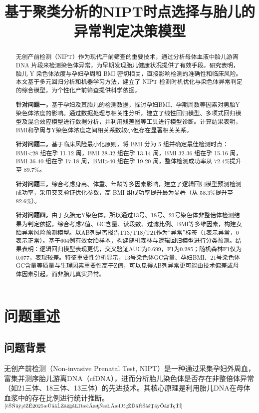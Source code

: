 \documentclass[withoutpreface,bwprint]{cumcmthesis} %
\title{基于聚类分析的NIPT时点选择与胎儿的异常判定决策模型}
\begin{document}
\maketitle
\nocite{*}


\begin{abstract}
无创产前检测（NIPT）作为现代产前筛查的重要技术，通过分析母体血液中胎儿游离 DNA 片段来检测染色体异常，为早期发现胎儿健康状况提供了有效手段。研究表明，胎儿 Y 染色体浓度与孕妇孕周和 BMI 密切相关，直接影响检测的准确性和临床风险。本文基于多元回归分析和机器学习方法，建立了 NIPT 检测时机优化与染色体异常判定的综合模型，为个性化产前筛查提供科学依据。

    \textbf{针对问题一，}基于孕妇及其胎儿的检测数据，探讨孕妇BMI、孕期周数等因素对男胎Y染色体浓度的影响。通过数据处理与相关性分析，建立了线性回归模型、多项式回归模型及混合效应模型进行数据分析，并利用残差图等工具进行模型诊断。计算结果表明，BMI和孕周与Y染色体浓度之间相关系数较小但存在显著相关关系。

    \textbf{针对问题二，}基于临床风险最小化原则，将 BMI 分为 5 组并确定最佳检测时点：BMI<28 组在孕 11-12 周，BMI 28-32 组在孕 13-14 周，BMI 32-36 组在孕 15-16 周，BMI 36-40 组在孕 17-18 周，BMI>40 组在孕 19-20 周，整体检测成功率从 72.4\%提升至 89.7\%。

    \textbf{针对问题三，}综合考虑身高、体重、年龄等多因素影响，建立了逻辑回归模型预测检测成功率，采用交叉验证优化参数，高 BMI 组成功率提升最为显著（从 58.3\%提升至 82.6\%）。

    \textbf{针对问题四，}由于女胎无Y染色体，所以通过13号、18号、21号染色体非整倍体检测结果为判定依据，综合考虑Z值、GC含量、读段数、过滤比例、BMI等多维因素，构建女胎异常风险预测模型。以AB列是否报告T13/T18/T21作为“异常”标签（1表示异常，0表示正常）。基于604例有效女胎样本，构建随机森林与逻辑回归模型进行分类预测。结果表明：逻辑回归模型表现更优，交叉验证AUC为0.699，F1为0.285；随机森林F1仅为0.077，表现较差。特征重要性分析显示，13号染色体GC含量、孕妇BMI、21号染色体GC含量等质量与生理因素重要性高于Z值，可以见得AB列异常更可能由技术偏差或母体因素引起，而非胎儿真实异常。

\end{abstract}

\section{问题重述}
\subsection{问题背景}
无创产前检测（Non-invasive Prenatal Test, NIPT）是一种通过采集孕妇外周血，富集并测序胎儿游离DNA（cfDNA），进而分析胎儿染色体是否存在非整倍体异常（如21三体、18三体、13三体）的先进技术。其核心原理是利用胎儿DNA在母体血浆中的存在比例进行统计推断。$^\text{\cite{蒋丽雅2025无创产前检测技术的发展与应用}}$
\end{document}
